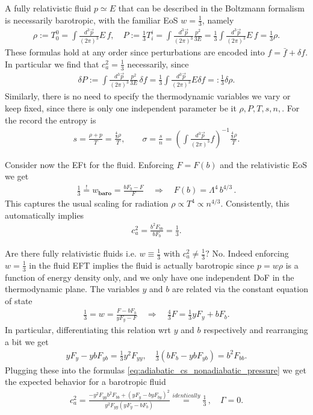 A fully relativistic fluid $p\simeq E$ that can be described in the Boltzmann formalism is necessarily barotropic, with the familiar EoS $w=\tfrac13$, namely
\begin{align}
    \rho:=T^0_0=\int\frac{d^3\vec{p}}{(2\pi)^3} E\, f, \quad P:= \tfrac13 T^i_i =\int\frac{d^3\vec{p}}{(2\pi)^3} \frac{p^2}{3E}= \frac13 \int\frac{d^3\vec{p}}{(2\pi)^3} E\, f = \tfrac13 \rho.
\end{align}
These formulas hold at any order since perturbations are encoded into $f=\bar{f}+\delta f$.
In particular we find that $c_a^2=\tfrac13$ necessarily, since
\begin{align}
    \delta P:=\int\frac{d^3\vec{p}}{(2\pi)^3} \frac{p^2}{3E}\, \delta f = \frac13 \int\frac{d^3\vec{p}}{(2\pi)^3} E \delta f =: \tfrac13 \delta\rho.
\end{align}
Similarly, there is no need to specify the thermodynamic variables we vary or keep fixed, since there is only one independent parameter be it $\rho,P,T,s,n,$.
For the record the entropy is
\begin{align}
    s=\frac{\rho+p}{T}= \frac{\tfrac43 \rho}{T}, \qquad \sigma=\frac{s}{n}=\left(\int\frac{d^3\vec{p}}{(2\pi)^3} f\right)^{-1} \frac{\tfrac43 \rho}{T}.
\end{align}

Consider now the EFt for the fluid.
Enforcing $F=F(b)$ and the relativistic EoS we get
\begin{align}
    \tfrac13 \overset{!}{=}w_{\textbf{baro}}=\frac{bF_b-F}{F}\quad \Rightarrow\quad F(b)=\Lambda^4\, b^{4/3}\,.
\end{align}
This captures the usual scaling for radiation $\rho\propto T^4 \propto n^{4/3}$.
Consistently, this automatically implies 
\begin{align}
    c_a^2=\frac{b^2F_{bb}}{bF_b}=\frac{1}{3}.
\end{align}

Are there fully relativistic fluids i.e. $w\equiv\tfrac13$ with $c_a^2\neq\tfrac13 ?$
No.
Indeed enforcing $w=\tfrac13$ in the fluid EFT implies the fluid is actually barotropic since $p=w\rho$ is a function of energy density only, and we only have one independent DoF in the thermodynamic plane.
The variables $y$ and $b$ are related via the constant equation of state 
\begin{align}
    \tfrac13=w=\frac{F-bF_b}{yF_y-F} \quad \Rightarrow\quad \tfrac43 F=\tfrac13 yF_y+bF_b.
\end{align}
In particular, differentiating this relation wrt $y$ and $b$ respectively and rearranging a bit we get
\begin{align}
    yF_y-ybF_{yb}=\tfrac13 y^2F_{yy}, \quad \tfrac13 (bF_b-ybF_{yb})=b^2F_{bb}.
\end{align}
Plugging these into the formulas \eqref{eq:adiabatic_cs_nonadiabatic_pressure} we get the expected behavior for a barotropic fluid
\begin{align}
    c_a^2=\frac{-y^2F_{yy}b^2F_{bb}+(yF_y-byF_{by})^2}{y^2F_{yy}(yF_y-bF_b)}\overset{identically}{=}\frac13\,, \quad \Gamma =0.
\end{align}

